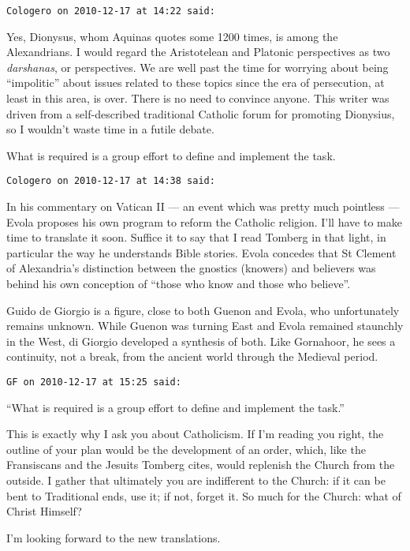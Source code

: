 \begin{footnotesize}
\begin{sffamily}
\hfill

\texttt{Cologero on 2010-12-17 at 14:22 said: }

Yes, Dionysus, whom Aquinas quotes some 1200 times, is among the Alexandrians. I would regard the Aristotelean and Platonic perspectives as two \emph{darshanas}, or perspectives. We are well past the time for worrying about being “impolitic” about issues related to these topics since the era of persecution, at least in this area, is over. There is no need to convince anyone. This writer was driven from a self-described traditional Catholic forum for promoting Dionysius, so I wouldn't waste time in a futile debate.

What is required is a group effort to define and implement the task.


\hfill

\texttt{Cologero on 2010-12-17 at 14:38 said: }

In his commentary on Vatican II — an event which was pretty much pointless — Evola proposes his own program to reform the Catholic religion. I'll have to make time to translate it soon. Suffice it to say that I read Tomberg in that light, in particular the way he understands Bible stories. Evola concedes that St Clement of Alexandria's distinction between the gnostics (knowers) and believers was behind his own conception of “those who know and those who believe”.

Guido de Giorgio is a figure, close to both Guenon and Evola, who unfortunately remains unknown. While Guenon was turning East and Evola remained staunchly in the West, di Giorgio developed a synthesis of both. Like Gornahoor, he sees a continuity, not a break, from the ancient world through the Medieval period.


\hfill

\texttt{GF on 2010-12-17 at 15:25 said: }

“What is required is a group effort to define and implement the task.”

This is exactly why I ask you about Catholicism. If I'm reading you right, the outline of your plan would be the development of an order, which, like the Fransiscans and the Jesuits Tomberg cites, would replenish the Church from the outside. I gather that ultimately you are indifferent to the Church: if it can be bent to Traditional ends, use it; if not, forget it. So much for the Church: what of Christ Himself? 

I'm looking forward to the new translations.


\hfill


\end{sffamily}
\end{footnotesize}
